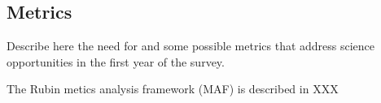 \subsection{Metrics}

Describe here the need for and some possible  metrics that address science opportunities in the first year of the survey. 

The Rubin metics analysis framework (MAF) is described in XXX